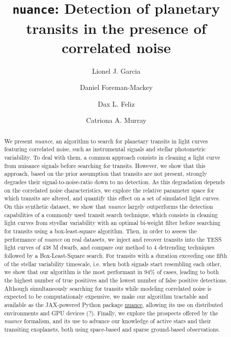\documentclass[modern]{aastex631}
\newcommand{\nuancemethod}{\textit{nuance}}
\newcommand{\nuancecode}{\textsf{nuance}}
\begin{document}
\title{\texttt{nuance}: Detection of planetary transits in the presence of correlated noise}

\author{Lionel J. Garcia}
\author{Daniel Foreman-Mackey}
\author{Dax L. Feliz}
\author{Catriona A. Murray}


\begin{abstract}
    We present \nuancemethod{}, an algorithm to search for planetary transits in light curves featuring correlated noise, such as instrumental signals and stellar photometric variability. To deal with them, a common approach consists in cleaning a light curve from nuisance signals before searching for transits. However, we show that this approach, based on the prior assumption that transits are not present, strongly degrades their signal-to-noise-ratio down to no detection. As this degradation depends on the correlated noise characteristics, we explore the relative parameter space for which transits are altered, and quantify this effect on a set of simulated light curves. On this synthetic dataset, we show that \nuancemethod{} largely outperforms the detection capabilities of a commonly used transit search technique, which consists in cleaning light curves from styellar variability with an optimal bi-weight filter before searching for transits using a box-least-square algorithm. Then, in order to assess the performance of \nuancemethod{} on real datasets, we inject and recover transits into the TESS light curves of 438 M dwarfs, and compare our method to 4 detrending techniques followed by a Box-Least-Square search. For transits with a duration exceeding one fifth of the stellar variability timescale, i.e. when both signals start resembling each other, we show that our algorithm is the most performant in 94\% of cases, leading to both the highest number of true positives and the lowest number of false positive detections. Although simultaneously searching for transits while modeling correlated noise is expected to be computationaly expensive, we make our algorithm tractable and available as the \textsf{JAX}-powered Python package \href{https://github.com/lgrcia/nuance}{\nuancecode{}}, allowing its use on distributed environments and GPU devices (?). Finally, we explore the prospects offered by the \nuancemethod{} formalism, and its use to advance our knowledge of active stars and their transiting exoplanets, both using space-based and sparse ground-based observations.
\end{abstract}
\end{document}
